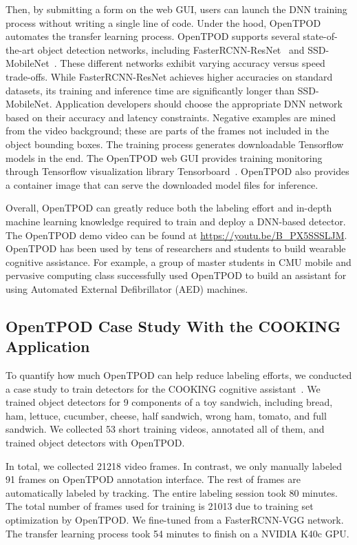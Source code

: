 Then, by submitting a form on the web GUI, users can launch the DNN training
process without writing a single line of code. Under the hood, OpenTPOD automates
the transfer learning process. OpenTPOD supports several state-of-the-art object
detection networks, including FasterRCNN-ResNet~\cite{ren2015faster,He2016} and
SSD-MobileNet~\cite{Liu2016,Howard2017}. These different networks exhibit
varying accuracy versus speed trade-offs. While FasterRCNN-ResNet achieves higher
accuracies on standard datasets, its training and inference time are
significantly longer than SSD-MobileNet. Application developers should choose
the appropriate DNN network based on their accuracy and latency constraints.
Negative examples are mined from the video background; these are parts of the
frames not included in the object bounding boxes.  The training process
generates downloadable Tensorflow models in the end. The OpenTPOD web GUI provides
training monitoring through Tensorflow visualization library
Tensorboard~\cite{tensorflow2017}. OpenTPOD also provides a container image that can
serve the downloaded model files for inference.

Overall, OpenTPOD can greatly reduce both the labeling effort and in-depth
machine learning knowledge required to train and deploy a DNN-based detector.
The OpenTPOD demo video can be found at \url{https://youtu.be/B_PX5SSSLJM}.
OpenTPOD has been used by tens of researchers and students to build wearable
cognitive assistance. For example, a group of master students in CMU mobile and
pervasive computing class successfully used OpenTPOD to build an assistant for
using Automated External Defibrillator (AED) machines.

\subsection{OpenTPOD Case Study With the COOKING Application}

To quantify how much OpenTPOD can help reduce labeling efforts, we conducted a case
study to train detectors for the COOKING cognitive
assistant~\cite{chen2018application}. We trained object detectors for 9
components of a toy sandwich, including bread, ham, lettuce, cucumber, cheese,
half sandwich, wrong ham, tomato, and full sandwich. We collected 53 short
training videos, annotated all of them, and trained object detectors with OpenTPOD.

In total, we collected 21218 video frames. In contrast, we only manually labeled
91 frames on OpenTPOD annotation interface. The rest of frames are automatically
labeled by tracking. The entire labeling session took 80 minutes. The total
number of frames used for training is 21013 due to training set optimization by
OpenTPOD. We fine-tuned from a FasterRCNN-VGG network. The transfer learning process
took 54 minutes to finish on a NVIDIA K40c GPU.


